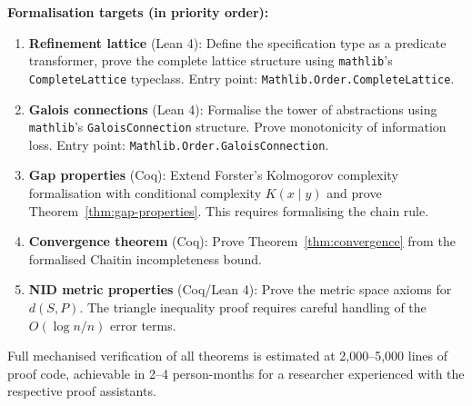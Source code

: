 \documentclass[11pt, a4paper, copyright]{googledeepmind}
\begin{document}
\textbf{Formalisation targets (in priority order):}
\begin{enumerate}
    \item \textbf{Refinement lattice} (Lean 4): Define the specification type as a predicate transformer, prove the complete lattice structure using \texttt{mathlib}'s \texttt{CompleteLattice} typeclass. Entry point: \texttt{Mathlib.Order.CompleteLattice}.
    \item \textbf{Galois connections} (Lean 4): Formalise the tower of abstractions using \texttt{mathlib}'s \texttt{GaloisConnection} structure. Prove monotonicity of information loss. Entry point: \texttt{Mathlib.Order.GaloisConnection}.
    \item \textbf{Gap properties} (Coq): Extend Forster's Kolmogorov complexity formalisation with conditional complexity $K(x \mid y)$ and prove Theorem~\ref{thm:gap-properties}. This requires formalising the chain rule.
    \item \textbf{Convergence theorem} (Coq): Prove Theorem~\ref{thm:convergence} from the formalised Chaitin incompleteness bound.
    \item \textbf{NID metric properties} (Coq/Lean 4): Prove the metric space axioms for $d(S, P)$. The triangle inequality proof requires careful handling of the $O(\log n / n)$ error terms.
\end{enumerate}

Full mechanised verification of all theorems is estimated at 2,000--5,000 lines of proof code, achievable in 2--4 person-months for a researcher experienced with the respective proof assistants.
\end{document}
